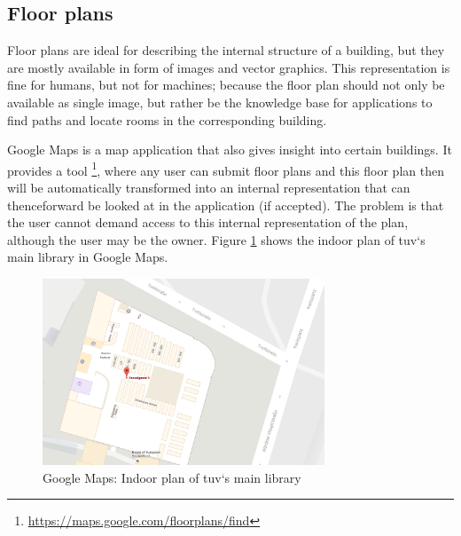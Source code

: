 \documentclass[draft,final]{vutinfth} %
\begin{document}
\subsection{Floor plans}
\label{solution-data-acquisition-floor-plans}
Floor plans are ideal for describing the internal structure of a building, but they are mostly available in form of images and vector graphics. This representation is fine for humans, but not for machines; because the floor plan should not only be available as single image, but rather be the knowledge base for applications to find paths and locate rooms in the corresponding building.

Google Maps is a map application that also gives insight into certain buildings. It provides a tool \footnote{\url{https://maps.google.com/floorplans/find}}, where any user can submit floor plans and this floor plan then will be automatically transformed into an internal representation that can thenceforward be looked at in the application (if accepted). The problem is that the user cannot demand access to this internal representation of the plan, although the user may be the owner. Figure \ref{fig:solution-data-acquisition:tuvienna-lib-gm-indoor} shows the indoor plan of \gls{tuv}`s main library in Google Maps.

\begin{figure}[h]
    \centering
    \includegraphics[width=0.75\textwidth]{graphics/google-maps-tu-vienna-library-indoor-plan.png}
    \caption{Google Maps: Indoor plan of \gls{tuv}`s main library}
    \label{fig:solution-data-acquisition:tuvienna-lib-gm-indoor}
\end{figure}
\end{document}
